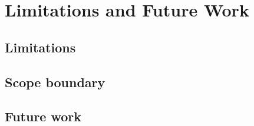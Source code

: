 \section{Limitations and Future Work}
\label{sec:limitations}


\subsection{Limitations}

\subsection{Scope boundary}

\subsection{Future work}

